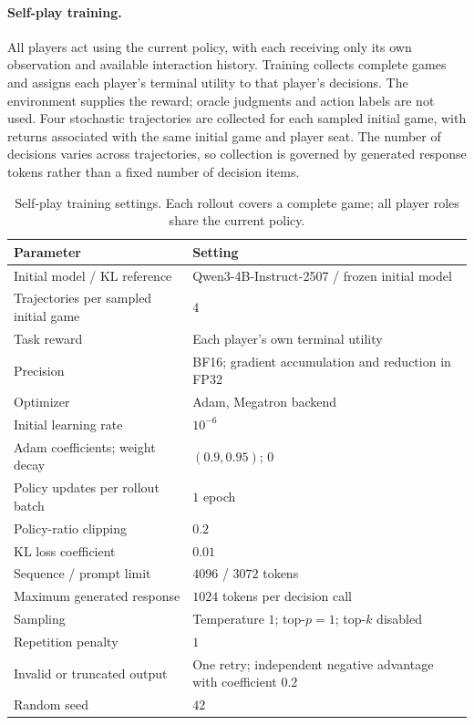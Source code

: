 \paragraph{Self-play training.}
All players act using the current policy, with each receiving only its own
observation and available interaction history. Training collects complete
games and assigns each player's terminal utility to that player's decisions.
The environment supplies the reward; oracle judgments and action labels are
not used. Four stochastic trajectories are collected for each sampled initial
game, with returns associated with the same initial game and player seat.
The number of decisions varies across trajectories, so collection is governed
by generated response tokens rather than a fixed number of decision items.

\begin{table}[H]
\centering\small
\renewcommand{\arraystretch}{1.12}
\setlength{\tabcolsep}{5pt}
\caption{Self-play training settings. Each rollout covers a complete game;
all player roles share the current policy.}
\label{tab:selfplay-configuration}
\begin{tabular}{@{}p{}p{}@{}}
\hline
Parameter & Setting \\
\hline
Initial model / KL reference & Qwen3-4B-Instruct-2507 / frozen initial model \\
Trajectories per sampled initial game & $4$ \\
Task reward & Each player's own terminal utility \\
Precision & BF16; gradient accumulation and reduction in FP32 \\
Optimizer & Adam, Megatron backend \\
Initial learning rate & $10^{-6}$ \\
Adam coefficients; weight decay & $(0.9,0.95)$; $0$ \\
Policy updates per rollout batch & $1$ epoch \\
Policy-ratio clipping & $0.2$ \\
KL loss coefficient & $0.01$ \\
Sequence / prompt limit & $4096$ / $3072$ tokens \\
Maximum generated response & $1024$ tokens per decision call \\
Sampling & Temperature $1$; top-$p=1$; top-$k$ disabled \\
Repetition penalty & $1$ \\
Invalid or truncated output & One retry; independent negative advantage with coefficient $0.2$ \\
Random seed & $42$ \\
\hline
\end{tabular}
\end{table}


